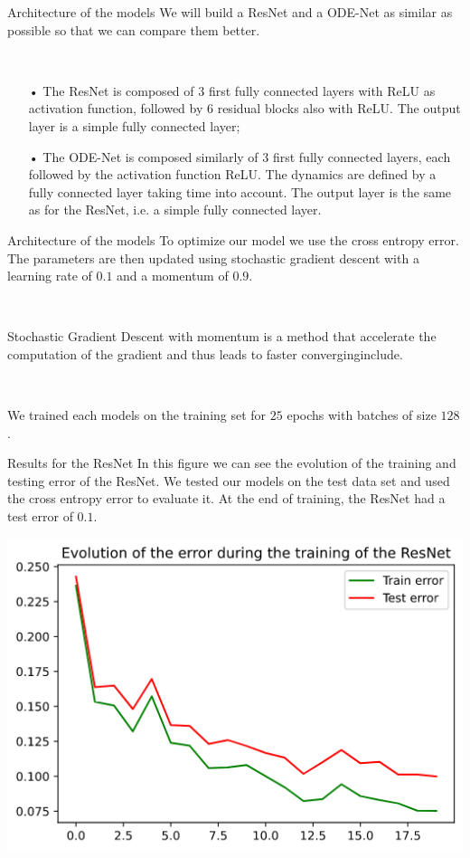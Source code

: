 \documentclass[11pt]{beamer}
\begin{document}
\begin{frame}{Architecture of the models}
We will build a ResNet and a ODE-Net as similar as possible so that we can compare them better.

~

\begin{itemize}
\item[•] The ResNet is composed of $3$ first fully connected layers with ReLU as activation function, followed by $6$ residual blocks also with ReLU. The output layer is a simple fully connected layer;
\item[•] The ODE-Net is composed similarly of $3$ first fully connected layers, each followed by the activation function ReLU. The dynamics are defined by a fully connected layer taking time into account. The output layer is the same as for the ResNet, i.e. a simple fully connected layer.
\end{itemize}
\end{frame}

\begin{frame}{Architecture of the models}
To optimize our model we use the cross entropy error. The parameters are then updated using stochastic gradient descent with a learning rate of $0.1$ and a momentum of $0.9$. 

~

Stochastic Gradient Descent with momentum is a method that accelerate the computation of the gradient and thus leads to faster converging\cite{8}include.

~

We trained each models on the training set for $25$ epochs with batches of size $128$. 
\end{frame}

\begin{frame}{Results for the ResNet}
In this figure we can see the evolution of the training and testing error of the ResNet. We tested our models on the test data set and used the cross entropy error to evaluate it. At the end of training, the ResNet had a test error of $0.1$.
\begin{center}
\includegraphics[scale=0.4]{resnet_rd_loss.png}
\end{center}

\end{frame}
\end{document}
